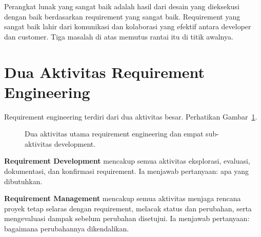\documentclass[11pt,a4paper]{article}
\begin{document}
Perangkat lunak yang sangat baik adalah hasil dari desain yang dieksekusi dengan baik berdasarkan requirement yang sangat baik. Requirement yang sangat baik lahir dari komunikasi dan kolaborasi yang efektif antara developer dan customer. Tiga masalah di atas memutus rantai itu di titik awalnya.

\section{Dua Aktivitas Requirement Engineering}

Requirement engineering terdiri dari dua aktivitas besar. Perhatikan Gambar~\ref{fig:re-tree}.

\begin{figure}[H]
	\centering
	\caption{Dua aktivitas utama requirement engineering dan empat sub-aktivitas development.}
	\label{fig:re-tree}
\end{figure}

\textbf{Requirement Development} mencakup semua aktivitas eksplorasi, evaluasi, dokumentasi, dan konfirmasi requirement. Ia menjawab pertanyaan: apa yang dibutuhkan.

\textbf{Requirement Management} mencakup semua aktivitas menjaga rencana proyek tetap selaras dengan requirement, melacak status dan perubahan, serta mengevaluasi dampak sebelum perubahan disetujui. Ia menjawab pertanyaan: bagaimana perubahannya dikendalikan.
\end{document}
